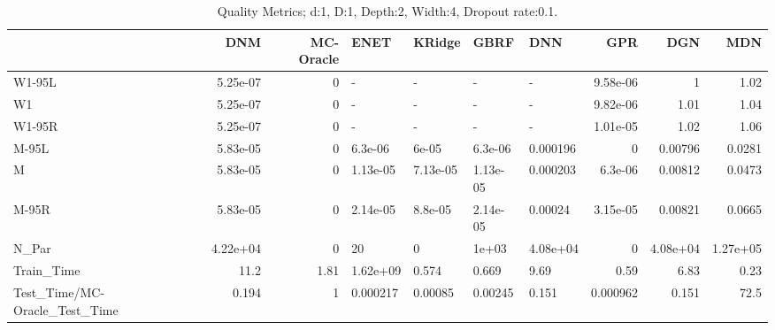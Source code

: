 \begin{table}
\centering
\caption{Quality Metrics; d:1, D:1, Depth:2, Width:4, Dropout rate:0.1.}
\begin{tabular}{lrrllllrrr}
\toprule
{} &      DNM &  MC-Oracle &     ENET &   KRidge &     GBRF &      DNN &      GPR &      DGN &      MDN \\
\midrule
W1-95L                        & 5.25e-07 &          0 &        - &        - &        - &        - & 9.58e-06 &        1 &     1.02 \\
W1                            & 5.25e-07 &          0 &        - &        - &        - &        - & 9.82e-06 &     1.01 &     1.04 \\
W1-95R                        & 5.25e-07 &          0 &        - &        - &        - &        - & 1.01e-05 &     1.02 &     1.06 \\
M-95L                         & 5.83e-05 &          0 &  6.3e-06 &    6e-05 &  6.3e-06 & 0.000196 &        0 &  0.00796 &   0.0281 \\
M                             & 5.83e-05 &          0 & 1.13e-05 & 7.13e-05 & 1.13e-05 & 0.000203 &  6.3e-06 &  0.00812 &   0.0473 \\
M-95R                         & 5.83e-05 &          0 & 2.14e-05 &  8.8e-05 & 2.14e-05 &  0.00024 & 3.15e-05 &  0.00821 &   0.0665 \\
N\_Par                         & 4.22e+04 &          0 &       20 &        0 &    1e+03 & 4.08e+04 &        0 & 4.08e+04 & 1.27e+05 \\
Train\_Time                    &     11.2 &       1.81 & 1.62e+09 &    0.574 &    0.669 &     9.69 &     0.59 &     6.83 &     0.23 \\
Test\_Time/MC-Oracle\_Test\_Time &    0.194 &          1 & 0.000217 &  0.00085 &  0.00245 &    0.151 & 0.000962 &    0.151 &     72.5 \\
\bottomrule
\end{tabular}
\end{table}
